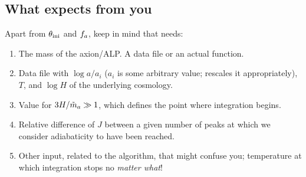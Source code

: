 \documentclass[10pt,utf8,compress,xcolor=dvipsnames]{beamer}
\begin{document}
\subsection{What \mimes expects from you}
\begin{frame}[fragile]{\insertsubsectionhead}
	Apart from $\theta_{\rm ini}{}$ and $f_{a}{}$, keep in mind that \mimes needs:
	\begin{enumerate}
		\item The mass of the axion/ALP. A data file or an actual function.
		\item Data file with $\log a/a_i$ ($a_i$ is some arbitrary value; \mimes rescales it appropriately), $T$, and $\log H$ of the underlying cosmology.\pause
		\item Value for $3H/\tilde m_{a}{} \gg 1$, which defines the point where integration begins.\pause
		\item Relative difference of $J$ between a given number of peaks at which we consider adiabaticity to have been reached.\pause
		\item Other input, related to the algorithm, that might confuse you; \eg temperature at which integration stops no {\em matter what}!
	\end{enumerate}
\end{frame}
\end{document}
